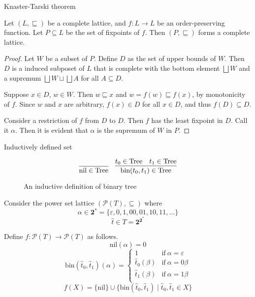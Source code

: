 \documentclass[9pt]{beamer}
\newcommand\pow[1]{\mathcal{P}(#1)}
\newcommand\two[0]{\mathbf{2}}
\newcommand\Tree[0]{\text{Tree}}
\newcommand\nil[0]{\text{nil}}
\newcommand\bin[0]{\text{bin}}
\begin{document}
\begin{frame}{Knaster-Tarski theorem}
  \begin{theorem}
    Let $(L,\sqsubseteq)$ be a complete lattice, and $f : L \to L$ be an order-preserving function. Let $P \subseteq L$ be the set of fixpoints of $f$. Then $(P, \sqsubseteq)$ forms a complete lattice.
  \end{theorem}
  \begin{proof}
    Let $W$ be a subset of $P$.
    Define $D$ as the set of upper bounds of $W$.
    Then $D$ is a induced subposet of $L$ that is complete with the bottom element $\bigsqcup W$ and
    a supremum $\bigsqcup W \sqcup \bigsqcup A$ for all $A \subseteq D$.

    Suppose $x \in D$, $w \in W$.
    Then $w \sqsubseteq x$ and $w = f(w) \sqsubseteq f(x)$, by monotonicity of $f$.
    Since $w$ and $x$ are arbitrary, $f(x) \in D$ for all $x \in D$, and thus $f(D) \subseteq D$.

    Consider a restriction of $f$ from $D$ to $D$.
    Then $f$ has the least fixpoint in $D$. Call it $\alpha$.
    Then it is evident that $\alpha$ is the supremum of $W$ in $P$.
  \end{proof}
\end{frame}

\begin{frame}{Inductively defined set}
  \begin{figure}
  \[
    \infer
    {\nil \in \Tree}
    { }
    \quad
    \infer
    {\bin(t_0,t_1) \in \Tree}
    {t_0 \in \Tree & t_1 \in \Tree}
  \]
  \caption{An inductive definition of binary tree}
  \end{figure}

  \pause
  Consider the power set lattice $(\pow{T}, \subseteq)$ where
  $$\alpha \in \two^* = \{\varepsilon, 0, 1, 00, 01, 10, 11, ...\}$$
  $$\hat t \in T = \two^{\two^*}$$

  Define $f : \pow{T} \to \pow{T}$ as follows.
  $$ \nil(\alpha) = 0 $$
  $$\bin(\hat t_0, \hat t_1)(\alpha) = \begin{cases}
    1               & \text{if} \ \alpha = \varepsilon \\
    \hat t_0(\beta) & \text{if} \ \alpha = 0\beta \\
    \hat t_1(\beta) & \text{if} \ \alpha = 1\beta \\
    \end{cases}
  $$
  $$ f(X) = \{\nil\} \cup \{\bin(\hat t_0,\hat t_1) \mid \hat t_0, \hat t_1 \in X\} $$
\end{frame}
\end{document}
